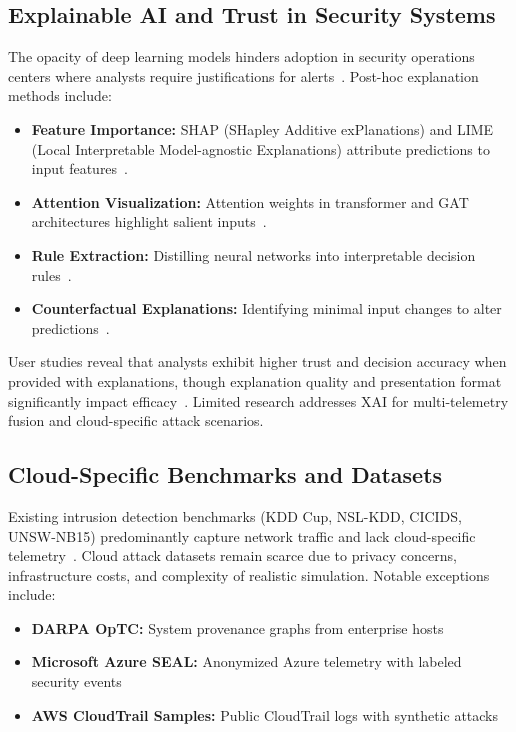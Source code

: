 \subsection{Explainable AI and Trust in Security Systems}
The opacity of deep learning models hinders adoption in security operations centers where analysts require justifications for alerts~\cite{darpa2020xai}. Post-hoc explanation methods include:
\begin{itemize}
    \item \textbf{Feature Importance:} SHAP (SHapley Additive exPlanations) and LIME (Local Interpretable Model-agnostic Explanations) attribute predictions to input features~\cite{lundberg2017shap,ribeiro2016lime}.
    \item \textbf{Attention Visualization:} Attention weights in transformer and GAT architectures highlight salient inputs~\cite{vaswani2017attention}.
    \item \textbf{Rule Extraction:} Distilling neural networks into interpretable decision rules~\cite{zilke2016ruleextraction}.
    \item \textbf{Counterfactual Explanations:} Identifying minimal input changes to alter predictions~\cite{wachter2017counterfactual}.
\end{itemize}

User studies reveal that analysts exhibit higher trust and decision accuracy when provided with explanations, though explanation quality and presentation format significantly impact efficacy~\cite{dodge2019xaistudy}. Limited research addresses XAI for multi-telemetry fusion and cloud-specific attack scenarios.

\subsection{Cloud-Specific Benchmarks and Datasets}
Existing intrusion detection benchmarks (KDD Cup, NSL-KDD, CICIDS, UNSW-NB15) predominantly capture network traffic and lack cloud-specific telemetry~\cite{ring2019survey}. Cloud attack datasets remain scarce due to privacy concerns, infrastructure costs, and complexity of realistic simulation. Notable exceptions include:
\begin{itemize}
    \item \textbf{DARPA OpTC:} System provenance graphs from enterprise hosts~\cite{darpaoptc2020}
    \item \textbf{Microsoft Azure SEAL:} Anonymized Azure telemetry with labeled security events~\cite{microsoftseal2021}
    \item \textbf{AWS CloudTrail Samples:} Public CloudTrail logs with synthetic attacks~\cite{awssamples2022}
\end{itemize}


